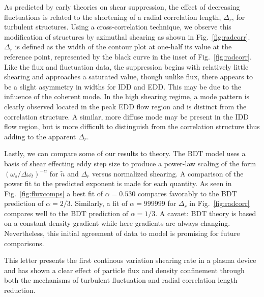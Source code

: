 \documentclass[%
 aps,
 prl,
 amsmath,amssymb,
 reprint,%
]{revtex4-1}
\begin{document}
As predicted by early theories on shear suppression, the effect of decreasing fluctuations is related to the shortening of a radial correlation length, $\Delta_{r}$, for turbulent structures. Using a cross-correlation technique, we observe this modification of structures by azimuthal shearing as shown in Fig.~\ref{fig:radcorr}. $\Delta_{r}$ is defined as the width of the contour plot at one-half its value at the reference point, represented by the black curve in the inset of Fig.~\ref{fig:radcorr}. Like the flux and fluctuation data, the suppression begins with relatively little shearing and approaches a saturated value, though unlike flux, there appears to be a slight asymmetry in widths for IDD and EDD. This may be due to the influence of the coherent mode. In the high shearing regime, a mode pattern is clearly observed located in the peak EDD flow region and is distinct from the correlation structure. A similar, more diffuse mode may be present in the IDD flow region, but is more difficult to distinguish from the correlation structure thus adding to the apparent $\Delta_{r}$.

Lastly, we can compare some of our results to theory. The BDT model \cite{biglari90} uses a basis of shear effecting eddy step size to produce a power-law scaling of the form $\left(\omega_{s}/\Delta \omega_{t}\right)^{-\alpha}$ for $\tilde{n}$ and $\Delta_{r}$ versus normalized shearing. A comparison of the power fit to the predicted exponent is made for each quantity. As seen in Fig.~\ref{fig:fluxcomps} a best fit of $\alpha = 0.530$ compares favorably to the BDT prediction of $\alpha = 2/3$. Similarly, a fit of $\alpha = 999999$ for $\Delta_{r}$ in Fig.~\ref{fig:radcorr} compares well to the BDT prediction of $\alpha = 1/3$. A cavaet: BDT theory is based on a constant density gradient while here gradients are always changing. Nevertheless, this initial agreement of data to model is promising for future comparisons.



This letter presents the first continous variation shearing rate in a plasma device and has shown a clear effect of particle flux and density confinement through both the mechanisms of turbulent fluctuation and radial correlation length reduction.

\end{document}
